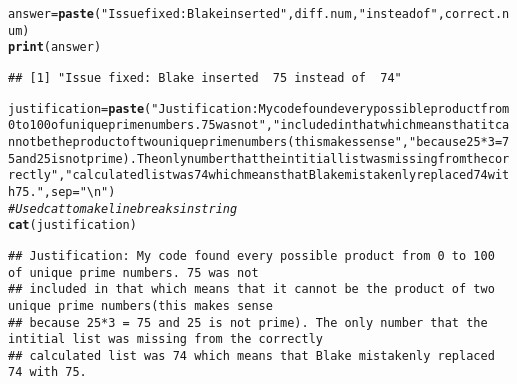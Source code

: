 \documentclass{article}\usepackage[]{graphicx}\usepackage[]{xcolor}
\makeatletter
\newcommand{\hlsng}[1]{\textcolor[rgb]{0.192,0.494,0.8}{#1}}%
\newcommand{\hlcom}[1]{\textcolor[rgb]{0.678,0.584,0.686}{\textit{#1}}}%
\newcommand{\hldef}[1]{\textcolor[rgb]{0.345,0.345,0.345}{#1}}%
\newcommand{\hlkwb}[1]{\textcolor[rgb]{0.69,0.353,0.396}{#1}}%
\newcommand{\hlkwc}[1]{\textcolor[rgb]{0.333,0.667,0.333}{#1}}%
\newcommand{\hlkwd}[1]{\textcolor[rgb]{0.737,0.353,0.396}{\textbf{#1}}}%
\newenvironment{kframe}{%
 \def\at@end@of@kframe{}%
 \ifinner\ifhmode%
  \def\at@end@of@kframe{\end{minipage}}%
  \begin{minipage}{\columnwidth}%
 \fi\fi%
 \def\FrameCommand##1{\hskip\@totalleftmargin \hskip-\fboxsep
 \colorbox{shadecolor}{##1}\hskip-\fboxsep
     \hskip-\linewidth \hskip-\@totalleftmargin \hskip\columnwidth}%
 \MakeFramed {\advance\hsize-\width
   \@totalleftmargin\z@ \linewidth\hsize
   \@setminipage}}%
 {\par\unskip\endMakeFramed%
 \at@end@of@kframe}
\newenvironment{knitrout}{}{} %
\makeatother
\begin{document}
\begin{enumerate}
\begin{knitrout}
\begin{kframe}
\begin{alltt}
\hldef{answer} \hlkwb{=} \hlkwd{paste}\hldef{(}\hlsng{"Issue fixed: Blake inserted "}\hldef{, diff.num,} \hlsng{"instead of "}\hldef{, correct.num)}
\hlkwd{print}\hldef{(answer)}
\end{alltt}
\begin{verbatim}
## [1] "Issue fixed: Blake inserted  75 instead of  74"
\end{verbatim}
\begin{alltt}
\hldef{justification} \hlkwb{=} \hlkwd{paste}\hldef{(}\hlsng{"Justification: My code found every possible product from 0 to 100 of unique prime numbers. 75 was not"}\hldef{,} \hlsng{"included in that which means that it cannot be the product of two unique prime numbers(this makes sense"}\hldef{,} \hlsng{"because 25*3 = 75 and 25 is not prime). The only number that the intitial list was missing from the correctly"}\hldef{,} \hlsng{"calculated list was 74 which means that Blake mistakenly replaced 74 with 75."}\hldef{,} \hlkwc{sep} \hldef{=} \hlsng{"\textbackslash{}n"}\hldef{)}
\hlcom{#Used cat to make line breaks in string}
\hlkwd{cat}\hldef{(justification)}
\end{alltt}
\begin{verbatim}
## Justification: My code found every possible product from 0 to 100 of unique prime numbers. 75 was not
## included in that which means that it cannot be the product of two unique prime numbers(this makes sense
## because 25*3 = 75 and 25 is not prime). The only number that the intitial list was missing from the correctly
## calculated list was 74 which means that Blake mistakenly replaced 74 with 75.
\end{verbatim}
\end{kframe}
\end{knitrout}
\end{enumerate}


\end{document}
